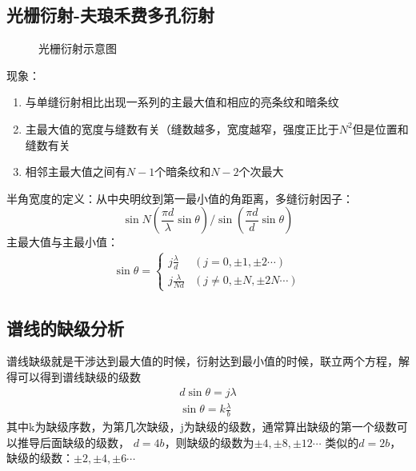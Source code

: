 \documentclass[UFT8]{article}
\begin{document}
\subsection{光栅衍射-夫琅禾费多孔衍射}
\begin{figure}[htbp]
\begin{center}
\end{center}
\caption{光栅衍射示意图}
\end{figure}
现象：
\begin{enumerate}
\item 与单缝衍射相比出现一系列的主最大值和相应的亮条纹和暗条纹
\item 主最大值的宽度与缝数有关（缝数越多，宽度越窄，强度正比于$N^2$但是位置和缝数有关
\item 相邻主最大值之间有$N-1$个暗条纹和$N-2$个次最大
\end{enumerate}
半角宽度的定义：从中央明纹到第一最小值的角距离，多缝衍射因子：
\[
	\sin N(\frac{\pi d}{\lambda}\sin \theta)/\sin (\frac{\pi d}{d}\sin \theta)
\]
主最大值与主最小值：
\begin{align*}
\sin\theta=
\begin{cases}
j\frac{\lambda}{d}&(j=0,\pm 1,\pm 2\cdots)\\
j\frac{\lambda}{Nd}&(j\neq0,\pm N,\pm 2N\cdots)
\end{cases}
\end{align*}
\subsection{谱线的缺级分析}
谱线缺级就是干涉达到最大值的时候，衍射达到最小值的时候，联立两个方程，解得可以得到谱线缺级的级数
\begin{gather*}
d\sin \theta=j\lambda\\
\sin\theta=k\frac{\lambda}{b}
\end{gather*}
其中k为缺级序数，为第几次缺级，j为缺级的级数，通常算出缺级的第一个级数可以推导后面缺级的级数，
$d=4b$，则缺级的级数为$\pm 4,\pm 8,\pm 12\cdots$
类似的$d=2b$，缺级的级数：$\pm 2,\pm 4,\pm 6\cdots$
\end{document}
